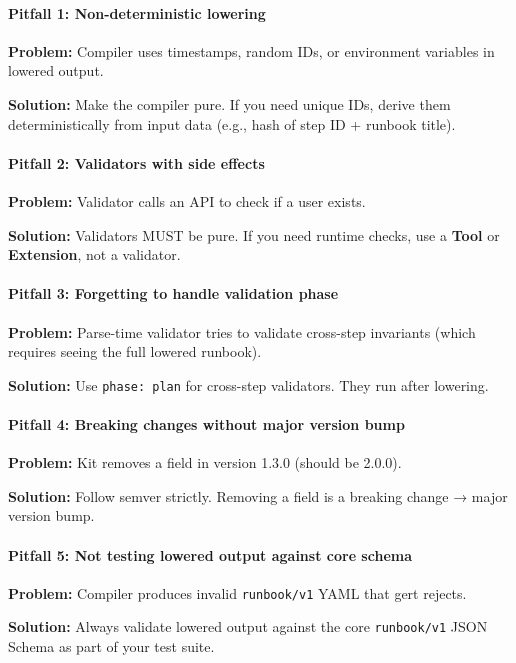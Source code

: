 \paragraph{Pitfall 1: Non-deterministic lowering}

\textbf{Problem:} Compiler uses timestamps, random IDs, or environment variables
in lowered output.

\textbf{Solution:} Make the compiler pure. If you need unique IDs, derive them
deterministically from input data (e.g., hash of step ID + runbook title).

\paragraph{Pitfall 2: Validators with side effects}

\textbf{Problem:} Validator calls an API to check if a user exists.

\textbf{Solution:} Validators MUST be pure. If you need runtime checks, use a
\textbf{Tool} or \textbf{Extension}, not a validator.

\paragraph{Pitfall 3: Forgetting to handle validation phase}

\textbf{Problem:} Parse-time validator tries to validate cross-step invariants
(which requires seeing the full lowered runbook).

\textbf{Solution:} Use \texttt{phase: plan} for cross-step validators. They run
after lowering.

\paragraph{Pitfall 4: Breaking changes without major version bump}

\textbf{Problem:} Kit removes a field in version 1.3.0 (should be 2.0.0).

\textbf{Solution:} Follow semver strictly. Removing a field is a breaking
change → major version bump.

\paragraph{Pitfall 5: Not testing lowered output against core schema}

\textbf{Problem:} Compiler produces invalid \texttt{runbook/v1} YAML that gert
rejects.

\textbf{Solution:} Always validate lowered output against the core
\texttt{runbook/v1} JSON Schema as part of your test suite.
